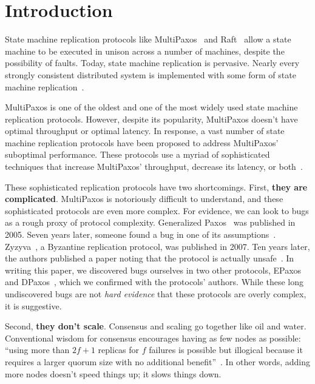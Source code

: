 \section{Introduction}
State machine replication protocols like MultiPaxos~\cite{lamport1998part,
lamport2001paxos} and Raft~\cite{ongaro2014search} allow a state machine to be
executed in unison across a number of machines, despite the possibility of
faults. Today, state machine replication is pervasive. Nearly every strongly
consistent distributed system is implemented with some form of state machine
replication~\cite{corbett2013spanner, thomson2012calvin, hunt2010zookeeper,
burrows2006chubby, baker2011megastore, cockroach2019website, cosmos2019website,
tidb2019website, yugabyte2019website}.

MultiPaxos is one of the oldest and one of the most widely used state machine
replication protocols. However, despite its popularity, MultiPaxos doesn't have
optimal throughput or optimal latency. In response, a vast number of state
machine replication protocols have been proposed to address MultiPaxos'
suboptimal performance.  These protocols use a myriad of sophisticated
techniques that increase MultiPaxos' throughput, decrease its latency, or
both~\cite{%
  arun2017speeding,
  biely2012s,
  howard2016flexible,
  lamport2005generalized,
  lamport2006fast,
  li2016just,
  mao2008mencius,
  moraru2013there,
  nawab2018dpaxos,
  park2019exploiting,
  ports2015designing
}.

These sophisticated replication protocols have two shortcomings. First,
\textbf{they are complicated}. MultiPaxos is notoriously difficult to
understand, and these sophisticated protocols are even more complex. For
evidence, we can look to bugs as a rough proxy of protocol complexity.
Generalized Paxos~\cite{lamport2005generalized} was published in 2005. Seven
years later, someone found a bug in one of its
assumptions~\cite{sutra2011fast}.  Zyzyva~\cite{kotla2007zyzzyva}, a Byzantine
replication protocol, was published in 2007. Ten years later, the authors
published a paper noting that the protocol is actually
unsafe~\cite{abraham2017revisiting}. In writing this paper, we discovered bugs
ourselves in two other protocols, EPaxos~\cite{moraru2013there} and
DPaxos~\cite{nawab2018dpaxos}, which we confirmed with the protocols' authors.
While these long undiscovered bugs are not \emph{hard evidence} that these
protocols are overly complex, it is suggestive.

Second, \textbf{they don't scale}. Consensus and scaling go together like oil
and water. Conventional wisdom for consensus encourages having as few nodes as
possible: ``using more than $2f+1$ replicas for $f$ failures is possible but
illogical because it requires a larger quorum size with no additional
benefit''~\cite{zhang2018building}. In other words, adding more nodes doesn't
speed things up; it slows things down.

